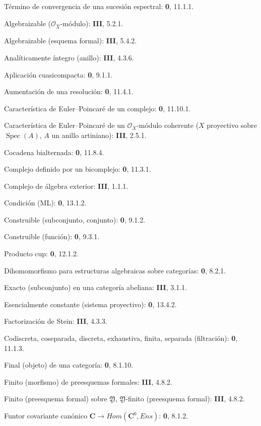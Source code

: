 \begin{flushleft}
Término de convergencia de una sucesión espectral: \textbf 0, 11.1.1.

Algebraizable ($\mathcal O_{\widehat X}$-módulo): \textbf{III}, 5.2.1.

Algebraizable (esquema formal): \textbf{III}, 5.4.2.

Analíticamente íntegro (anillo): \textbf{III}, 4.3.6.

Aplicación cuasicompacta: \textbf 0, 9.1.1.

Aumentación de una resolución: \textbf 0, 11.4.1.

Característica de Euler--Poincaré de un complejo: \textbf 0, 11.10.1.

Característica de Euler--Poincaré de un $\mathcal O_X$-módulo coherente
($X$ proyectivo sobre $\operatorname{Spec}(A)$, $A$ un anillo artiniano): \textbf{III}, 2.5.1.

Cocadena bialternada: \textbf 0, 11.8.4.

Complejo definido por un bicomplejo: \textbf 0, 11.3.1.

Complejo de álgebra exterior: \textbf{III}, 1.1.1.

Condición (ML): \textbf 0, 13.1.2.

Construible (subconjunto, conjunto): \textbf 0, 9.1.2.

Construible (función): \textbf 0, 9.3.1.

Producto cup: \textbf 0, 12.1.2.

Dihomomorfismo para estructuras algebraicas sobre categorías: \textbf 0, 8.2.1.

Exacto (subconjunto) en una categoría abeliana: \textbf{III}, 3.1.1.

Esencialmente constante (sistema proyectivo): \textbf 0, 13.4.2.

Factorización de Stein: \textbf{III}, 4.3.3.

Codiscreta, coseparada, discreta, exhaustiva, finita, separada
(filtración): \textbf 0, 11.1.3.

Final (objeto) de una categoría: \textbf 0, 8.1.10.

Finito (morfismo) de preesquemas formales: \textbf{III}, 4.8.2.

Finito (preesquema formal) sobre $\mathfrak Y$,
$\mathfrak Y$-finito (preesquema formal): \textbf{III}, 4.8.2.

Funtor covariante canónico $\boldsymbol{C}\to\boldsymbol{\mathit{Hom}}(\boldsymbol{C}^0,\boldsymbol{\mathit{Ens}})$: \textbf 0, 8.1.2.


\end{flushleft}

